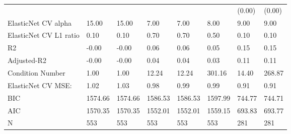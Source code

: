 \begin{table}
\begin{center}
\begin{tabular}{llllllll}
                                               &         &         &         &         &          & (0.00)    & (0.00)   \\
ElasticNet CV alpha                            & 15.00   & 15.00   & 7.00    & 7.00    & 8.00     & 9.00      & 9.00     \\
ElasticNet CV  L1 ratio                        & 0.10    & 0.10    & 0.70    & 0.70    & 0.50     & 0.10      & 0.10     \\
R2                                             & -0.00   & -0.00   & 0.06    & 0.06    & 0.05     & 0.15      & 0.15     \\
Adjusted-R2                                    & -0.00   & -0.00   & 0.04    & 0.04    & 0.03     & 0.11      & 0.11     \\
Condition Number                               & 1.00    & 1.00    & 12.24   & 12.24   & 301.16   & 14.40     & 268.87   \\
ElasticNet CV MSE:                             & 1.02    & 1.03    & 0.98    & 0.99    & 0.99     & 0.91      & 0.91     \\
BIC                                            & 1574.66 & 1574.66 & 1586.53 & 1586.53 & 1597.99  & 744.77    & 744.71   \\
AIC                                            & 1570.35 & 1570.35 & 1552.01 & 1552.01 & 1559.15  & 693.83    & 693.77   \\
N                                              & 553     & 553     & 553     & 553     & 553      & 281       & 281      \\
\hline
\end{tabular}
\end{center}
\end{table}
